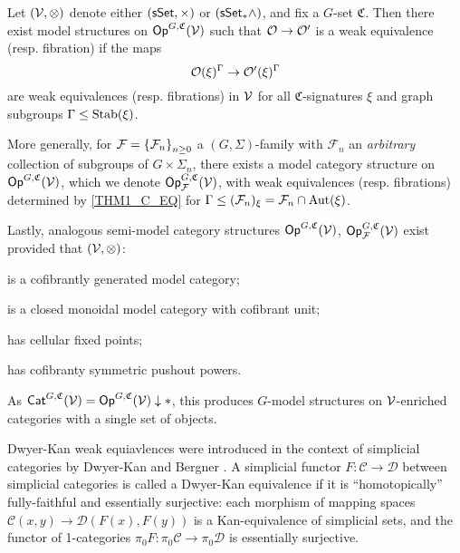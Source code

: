 \documentclass[a4paper,10pt
,draft
]{article}%
\renewcommand{\F}{\mathcal F}
\renewcommand{\1}{\eta}%
\begin{document}
\begin{theorem}
      \label{THM1_C}
      Let $(\mathcal V,\otimes)$ denote either $(\mathsf{sSet}, \times)$ or $(\sSet_{\**} \wedge)$,
      and fix a $G$-set $\mathfrak C$.
      Then there exist model structures on $\mathsf{Op}^{G, \mathfrak C}(\mathcal V)$ such that
      $\mathcal{O} \to \mathcal{O}'$ is a weak equivalence (resp. fibration) if the maps
      \begin{equation}
            \label{THM1_C_EQ}
            \mathcal{O}(\xi)^\Gamma \to \mathcal{O}'(\xi)^\Gamma
      \end{equation}
      are weak equivalences (resp. fibrations) in $\mathcal V$ for all
      $\mathfrak C$-signatures $\xi$ and
      graph subgroups $\Gamma \leq \mathrm{Stab}(\xi)$.

      More generally, for $\F = \set{\F_n}_{n \geq 0}$ a $(G, \Sigma)$-family with $\F_n$ an \textit{arbitrary} collection of subgroups of $G \times \Sigma_n$,
      there exists a model category structure on $\mathsf{Op}^{G, \mathfrak C}(\mathcal V)$, which we denote $\Op^{G, \mathfrak C}_\F(\V)$,
      with weak equivalences (resp. fibrations) determined by \eqref{THM1_C_EQ} for $\Gamma \leq (\F_n)_\ksi = \F_n \cap \Aut(\ksi)$.

      Lastly, analogous semi-model category structures $\mathsf{Op}^{G, \mathfrak C}(\mathcal V)$, $\Op^{G, \mathfrak C}_\F(\V)$ exist provided that
      $(\mathcal V, \otimes)$:
      \begin{enumerate*}[label = (\roman*)]
      \item is a cofibrantly generated model category;
      \item is a closed monoidal model category with cofibrant unit;
      \item has cellular fixed points;
      \item has cofibranty symmetric pushout powers.
      \end{enumerate*}
\end{theorem}

\begin{remark}
      As $\Cat^{G, \mathfrak C}(\V) = \Op^{G, \mathfrak C}(\V) \downarrow \**$,
      this produces $G$-model structures on $\mathcal V$-enriched categories with a single set of objects.
\end{remark}




Dwyer-Kan weak equiavlences were introduced in the context of simplicial categories by Dwyer-Kan and Bergner \cite{DK80, Ber07b}.
A simplicial functor $F: \mathcal C \to \mathcal D$ between simplicial categories is called a Dwyer-Kan equivalence if
it is ``homotopically'' fully-faithful and essentially surjective:
each morphism of mapping spaces $\mathcal C(x, y) \to \mathcal D(F(x), F(y))$ is a Kan-equivalence of simplicial sets, and
the functor of 1-categories $\pi_0F: \pi_0\mathcal C \to \pi_0 \mathcal D$ is essentially surjective.
\end{document}
